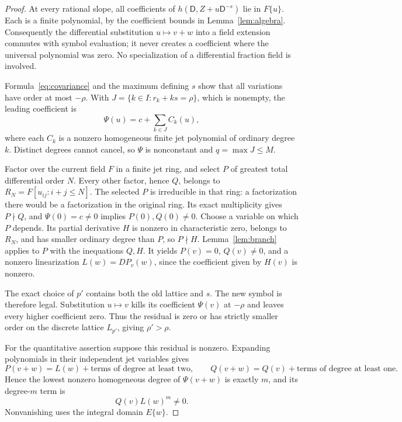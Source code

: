 \documentclass{article}
\newcommand{\DD}{\mathsf D}
\begin{document}
\begin{proof}
At every rational slope, all coefficients of $h(\DD,Z+u\DD^{-s})$ lie in $F\{u\}$. Each is a finite polynomial, by the coefficient bounds in Lemma~\ref{lem:algebra}. Consequently the differential substitution $u\mapsto v+w$ into a field extension commutes with symbol evaluation; it never creates a coefficient where the universal polynomial was zero. No specialization of a differential fraction field is involved.

Formula~\eqref{eq:covariance} and the maximum defining $s$ show that all variations have order at most $-\rho$. With
$J=\{k\in I:r_k+ks=\rho\}$, which is nonempty, the leading coefficient is
\[
 \Psi(u)=c+\sum_{k\in J}C_k(u),
 \tag{5.1}\label{eq:leadingequation}
\]
where each $C_k$ is a nonzero homogeneous finite jet polynomial of ordinary degree $k$. Distinct degrees cannot cancel, so $\Psi$ is nonconstant and $q=\max J\leq M$.

Factor over the current field $F$ in a finite jet ring, and select $P$ of greatest total differential order $N$. Every other factor, hence $Q$, belongs to $R_N=F[u_{ij}:i+j\leq N]$. The selected $P$ is irreducible in that ring: a factorization there would be a factorization in the original ring. Its exact multiplicity gives $P\nmid Q$, and $\Psi(0)=c\ne0$ implies $P(0),Q(0)\ne0$. Choose a variable on which $P$ depends. Its partial derivative $H$ is nonzero in characteristic zero, belongs to $R_N$, and has smaller ordinary degree than $P$, so $P\nmid H$. Lemma~\ref{lem:branch} applies to $P$ with the inequations $Q,H$. It yields $P(v)=0$, $Q(v)\ne0$, and a nonzero linearization
$L(w)=DP_v(w)$, since the coefficient given by $H(v)$ is nonzero.

The exact choice of $p'$ contains both the old lattice and $s$. The new symbol is therefore legal. Substitution $u\mapsto v$ kills its coefficient $\Psi(v)$ at $-\rho$ and leaves every higher coefficient zero. Thus the residual is zero or has strictly smaller order on the discrete lattice $L_{p'}$, giving $\rho'>\rho$.

For the quantitative assertion suppose this residual is nonzero. Expanding polynomials in their independent jet variables gives
\[
 P(v+w)=L(w)+\text{terms of degree at least two},\qquad
 Q(v+w)=Q(v)+\text{terms of degree at least one}.
\]
Hence the lowest nonzero homogeneous degree of $\Psi(v+w)$ is exactly $m$, and its degree-$m$ term is
\[
 Q(v)L(w)^m\ne0.\tag{5.2}\label{eq:translateddegree}
\]
Nonvanishing uses the integral domain $E\{w\}$.


\end{proof}
\end{document}
